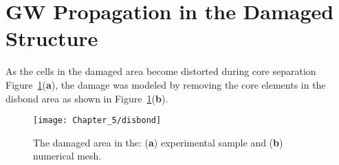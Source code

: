 \section{GW Propagation in the Damaged Structure}
\label{sec:disbond}

As the cells in the damaged area become distorted during core separation Figure~\ref{fig:disbond}(\textbf{a}), %
the damage was modeled by removing the core elements in the disbond area as shown in Figure~\ref{fig:disbond}(\textbf{b}).
\begin{figure}[H]
	\texttt{[image: Chapter\_5/disbond]}
	\caption{The damaged area in the: (\textbf{a}) experimental sample and (\textbf{b}) numerical mesh.}
	\label{fig:disbond}
\end{figure}
